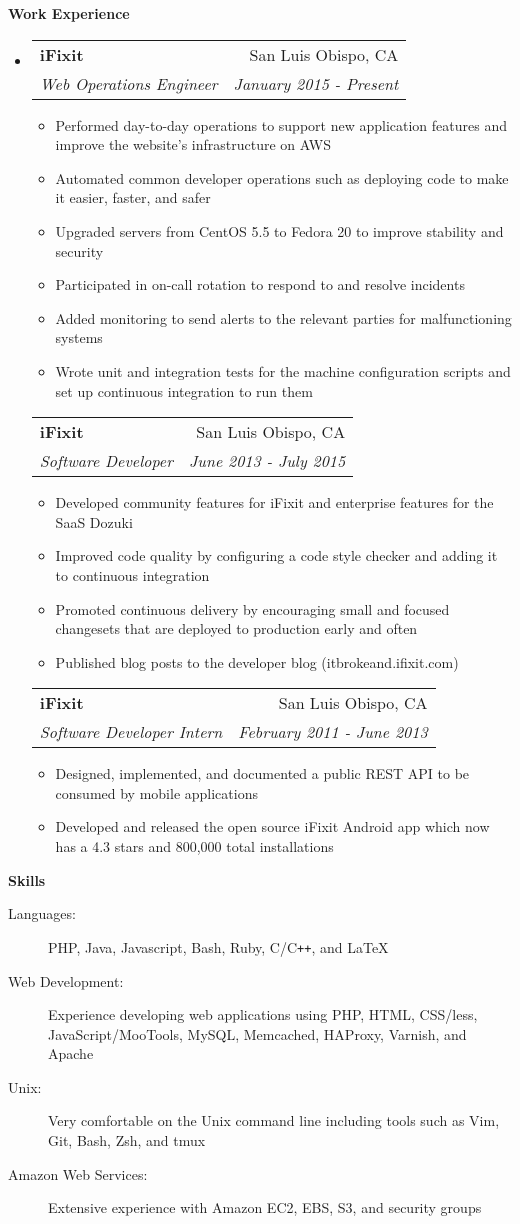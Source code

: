 \documentclass[letterpaper,11pt]{article}
\makeatletter
\newcommand{\resitem}[1]{\item #1 \vspace{-2pt}}
\newcommand{\resheading}[1]{{\large \colorbox{mygrey}{\begin{minipage}{\textwidth}{\textbf{#1 \vphantom{p\^{E}}}}\end{minipage}}}}
\newcommand{\ressubheading}[4]{
\begin{tabular*}{7.0in}{l@{\extracolsep{\fill}}r}
      \textbf{#1} & #2 \\
      \textit{#3} & \textit{#4} \\
\end{tabular*}\vspace{-6pt}}
\makeatother
\begin{document}
\resheading{Work Experience}
\begin{itemize}
\item
   \ressubheading{iFixit}{San Luis Obispo, CA}{Web Operations Engineer}{January 2015 - Present}
   \begin{itemize}
      \resitem{Performed day-to-day operations to support new application features and improve the website's infrastructure on AWS}
      \resitem{Automated common developer operations such as deploying code to make it easier, faster, and safer}
      \resitem{Upgraded servers from CentOS 5.5 to Fedora 20 to improve stability and security}
      \resitem{Participated in on-call rotation to respond to and resolve incidents}
      \resitem{Added monitoring to send alerts to the relevant parties for malfunctioning systems}
      \resitem{Wrote unit and integration tests for the machine configuration scripts and set up continuous integration to run them}
   \end{itemize}
   \ressubheading{iFixit}{San Luis Obispo, CA}{Software Developer}{June 2013 - July 2015}
   \begin{itemize}
      \resitem{Developed community features for iFixit and enterprise features for the SaaS Dozuki}
      \resitem{Improved code quality by configuring a code style checker and adding it to continuous integration}
      \resitem{Promoted continuous delivery by encouraging small and focused changesets that are deployed to production early and often}
      \resitem{Published blog posts to the developer blog (itbrokeand.ifixit.com)}
   \end{itemize}
   \ressubheading{iFixit}{San Luis Obispo, CA}{Software Developer Intern}{February 2011 - June 2013}
   \begin{itemize}
      \resitem{Designed, implemented, and documented a public REST API to be consumed by mobile applications}
      \resitem{Developed and released the open source iFixit Android app which now has a 4.3 stars and 800,000 total installations}
   \end{itemize}
\end{itemize}

\resheading{Skills}

\begin{description}
\item[Languages:]
PHP, Java, Javascript, Bash, Ruby, C/C{}\verb!++!, and \LaTeX
\item[Web Development:]
Experience developing web applications using PHP, HTML, CSS/less, JavaScript/MooTools, MySQL, Memcached, HAProxy, Varnish, and Apache
\item[Unix:]
Very comfortable on the Unix command line including tools such as Vim, Git, Bash, Zsh, and tmux
\item[Amazon Web Services:]
Extensive experience with Amazon EC2, EBS, S3, and security groups
\end{description}
\end{document}
